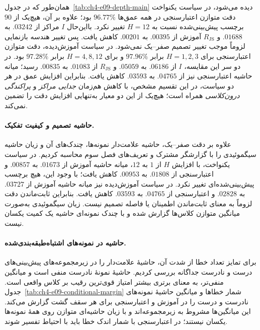 همان‌طور که در جدول~\ref{tab:ch4-e09-depth-main}
دیده می‌شود، در سیاست یکنواخت دقت متوازن
اعتبارسنجی در همه عمق‌ها $96.77\%$
بود؛ علاوه بر آن، هیچ‌یک از $90$ برچسب
پیش‌بینی‌شده نسبت به $H=12$ تغییر نکرد.
بااین‌حال $I$ مراکز از $.03242$ به $.01688$
و $R_{\mathrm{JS}}$ آموزش از $.00395$ به $.00201$
کاهش یافت. پس تغییر هندسه بازنمایی
لزوماً موجب تغییر تصمیم صفر--یک نمی‌شود.
در سیاست آموزش‌دیده، دقت متوازن اعتبارسنجی
برای $H=1,2,3$ برابر $97.96\%$
و برای $H=4,8,12$ برابر $97.28\%$ بود.
در دو سر این مقایسه، $I$ از $.06186$
به $.05059$ و $R_{\mathrm{JS}}$ از $.01083$
به $.00835$ رسید؛ میانه حاشیه اعتبارسنجی
نیز از $.04765$ به $.03593$ کاهش یافت.
بنابراین افزایش عمق در هر دو سیاست،
در این تقسیم مشخص، با کاهش هم‌زمان
\emph{جدایی مراکز} و \emph{پراکندگی درون‌کلاسی}
همراه است؛ هیچ‌یک از این دو معیار به‌تنهایی
افزایش دقت را تضمین نمی‌کند.



\paragraph{حاشیه تصمیم و کیفیت تفکیک.}
علاوه بر دقت صفر--یک، حاشیه علامت‌دار
نمونه‌ها، چندک‌های آن و زیان حاشیه
سیگموئیدی را با گزارشگر مشترک و
تعریف‌های فصل سوم محاسبه کردیم.
در سیاست یکنواخت، با افزایش $H$ از $1$
به $12$، میانه حاشیه آموزش از $.01673$
به $.00857$ و اعتبارسنجی از $.01808$
به $.00953$ کاهش یافت؛ با وجود این،
هیچ برچسب پیش‌بینی‌شده‌ای تغییر نکرد.
در سیاست آموزش‌دیده نیز میانه حاشیه
آموزش از $.03727$ به $.02828$ و
اعتبارسنجی از $.04765$ به $.03593$
کاهش یافت. بنابراین ثابت‌ماندن دقت
لزوماً به معنای ثابت‌ماندن اطمینان
یا فاصله تصمیم نیست. زیان سیگموئیدی
به‌صورت میانگین متوازن کلاس‌ها گزارش شده
و با چندک نمونه‌ای حاشیه یک کمیت
یکسان نیست.




\paragraph{حاشیه در نمونه‌های اشتباه‌طبقه‌بندی‌شده.}
برای تمایز تعداد خطا از شدت آن، حاشیهٔ علامت‌دار
را در زیرمجموعه‌های پیش‌بینی‌های درست و نادرست
جداگانه بررسی کردیم. حاشیهٔ نمونهٔ نادرست
منفی است و میانگین منفی‌تر، به معنای برتری
بیشتر امتیاز قوی‌ترین رقیب بر کلاس واقعی است.
جدول~\ref{tab:ch4-e09-conditional-margin}
شمار خطاها و میانگین حاشیهٔ نمونه‌های نادرست
و درست را در آموزش و اعتبارسنجی برای هر سقف
گشت گزارش می‌کند. این میانگین‌ها مشروط
به زیرمجموعه‌اند و با زیان حاشیه‌ای متوازن
روی همهٔ نمونه‌ها یکسان نیستند؛ در اعتبارسنجی
با شمار اندک خطا باید با احتیاط تفسیر شوند.


